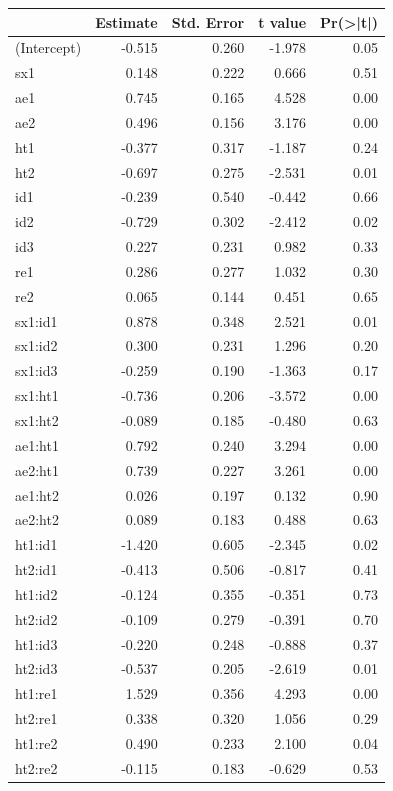 \documentclass[]{book}
\theoremstyle{definition}
\theoremstyle{definition}
\theoremstyle{definition}
\theoremstyle{remark}
\begin{document}
\begin{tabular}{lrrrr}
\toprule
  & Estimate & Std. Error & t value & Pr(>|t|)\\
\midrule
(Intercept) & -0.515 & 0.260 & -1.978 & 0.05\\
sx1 & 0.148 & 0.222 & 0.666 & 0.51\\
ae1 & 0.745 & 0.165 & 4.528 & 0.00\\
ae2 & 0.496 & 0.156 & 3.176 & 0.00\\
ht1 & -0.377 & 0.317 & -1.187 & 0.24\\
\addlinespace
ht2 & -0.697 & 0.275 & -2.531 & 0.01\\
id1 & -0.239 & 0.540 & -0.442 & 0.66\\
id2 & -0.729 & 0.302 & -2.412 & 0.02\\
id3 & 0.227 & 0.231 & 0.982 & 0.33\\
re1 & 0.286 & 0.277 & 1.032 & 0.30\\
\addlinespace
re2 & 0.065 & 0.144 & 0.451 & 0.65\\
sx1:id1 & 0.878 & 0.348 & 2.521 & 0.01\\
sx1:id2 & 0.300 & 0.231 & 1.296 & 0.20\\
sx1:id3 & -0.259 & 0.190 & -1.363 & 0.17\\
sx1:ht1 & -0.736 & 0.206 & -3.572 & 0.00\\
\addlinespace
sx1:ht2 & -0.089 & 0.185 & -0.480 & 0.63\\
ae1:ht1 & 0.792 & 0.240 & 3.294 & 0.00\\
ae2:ht1 & 0.739 & 0.227 & 3.261 & 0.00\\
ae1:ht2 & 0.026 & 0.197 & 0.132 & 0.90\\
ae2:ht2 & 0.089 & 0.183 & 0.488 & 0.63\\
\addlinespace
ht1:id1 & -1.420 & 0.605 & -2.345 & 0.02\\
ht2:id1 & -0.413 & 0.506 & -0.817 & 0.41\\
ht1:id2 & -0.124 & 0.355 & -0.351 & 0.73\\
ht2:id2 & -0.109 & 0.279 & -0.391 & 0.70\\
ht1:id3 & -0.220 & 0.248 & -0.888 & 0.37\\
\addlinespace
ht2:id3 & -0.537 & 0.205 & -2.619 & 0.01\\
ht1:re1 & 1.529 & 0.356 & 4.293 & 0.00\\
ht2:re1 & 0.338 & 0.320 & 1.056 & 0.29\\
ht1:re2 & 0.490 & 0.233 & 2.100 & 0.04\\
ht2:re2 & -0.115 & 0.183 & -0.629 & 0.53\\
\bottomrule
\end{tabular}
\end{document}
